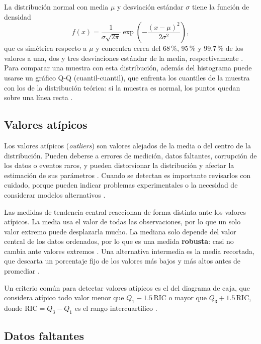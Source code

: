 \documentclass[11pt,letterpaper]{article}
\begin{document}
La distribución normal con media $\mu$ y desviación estándar $\sigma$ tiene la función de densidad
\begin{equation}
    f(x) = \frac{1}{\sigma\sqrt{2\pi}} \exp\!\left(-\frac{(x - \mu)^2}{2\sigma^2}\right),
\end{equation}
que es simétrica respecto a $\mu$ y concentra cerca del 68\,\%, 95\,\% y 99.7\,\% de los valores a una, dos y tres desviaciones estándar de la media, respectivamente \parencite{bonamente2017}. Para comparar una muestra con esta distribución, además del histograma puede usarse un gráfico Q-Q (cuantil-cuantil), que enfrenta los cuantiles de la muestra con los de la distribución teórica: si la muestra es normal, los puntos quedan sobre una línea recta \parencite{bruce2020}.

\subsection{Valores atípicos}

Los valores atípicos (\textit{outliers}) son valores alejados de la media o del centro de la distribución. Pueden deberse a errores de medición, datos faltantes, corrupción de los datos o eventos raros, y pueden distorsionar la distribución y afectar la estimación de sus parámetros \parencite{tecnm2026_documento_fuente,brownlee2019}. Cuando se detectan es importante revisarlos con cuidado, porque pueden indicar problemas experimentales o la necesidad de considerar modelos alternativos \parencite{tecnm2026_documento_fuente}.

Las medidas de tendencia central reaccionan de forma distinta ante los valores atípicos. La media usa el valor de todas las observaciones, por lo que un solo valor extremo puede desplazarla mucho. La mediana solo depende del valor central de los datos ordenados, por lo que es una medida \textbf{robusta}: casi no cambia ante valores extremos \parencite{bruce2020}. Una alternativa intermedia es la media recortada, que descarta un porcentaje fijo de los valores más bajos y más altos antes de promediar \parencite{bruce2020}.

Un criterio común para detectar valores atípicos es el del diagrama de caja, que considera atípico todo valor menor que $Q_1 - 1.5\,\text{RIC}$ o mayor que $Q_3 + 1.5\,\text{RIC}$, donde $\text{RIC} = Q_3 - Q_1$ es el rango intercuartílico \parencite{bruce2020}.

\subsection{Datos faltantes}
\end{document}
